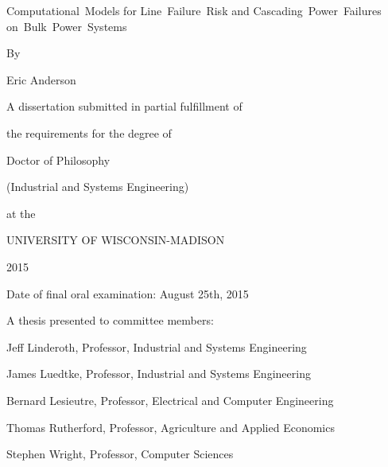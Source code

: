 \begin{titlepage}
    \begin{center}
        
Computational~Models for 
Line~Failure~Risk and Cascading~Power~Failures 
on~Bulk~Power~Systems
              
\vfill

        By

        Eric Anderson

        \vfill

        A dissertation submitted in partial fulfillment of

        the requirements for the degree of

        \vfill

        Doctor of Philosophy

        (Industrial and Systems Engineering)

        \vfill 

        at the

        UNIVERSITY OF WISCONSIN-MADISON

        2015

        \vfill

    \end{center}

    Date of final oral examination: August 25th, 2015


\singlespacing        
        A thesis presented to committee members:

        Jeff Linderoth, Professor, Industrial and Systems Engineering

        James Luedtke, Professor, Industrial and Systems Engineering

        Bernard Lesieutre, Professor, Electrical and Computer Engineering

        Thomas Rutherford, Professor, Agriculture and Applied Economics

        Stephen Wright, Professor, Computer Sciences

\doublespacing
        

\end{titlepage}
